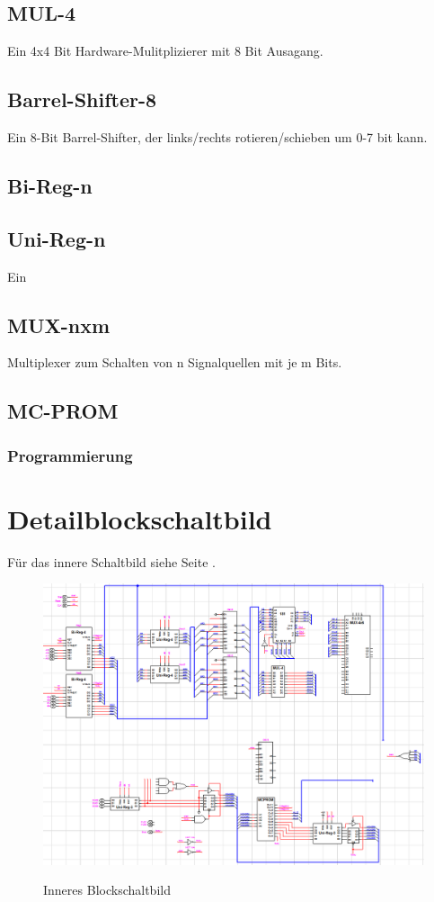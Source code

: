 \documentclass[11pt]{report}
\begin{document}
	\subsection{MUL-4}
	Ein 4x4 Bit Hardware-Mulitplizierer mit 8 Bit Ausagang.
	
	\subsection{Barrel-Shifter-8}
	Ein 8-Bit Barrel-Shifter, der links/rechts rotieren/schieben um  0-7 bit kann.
	\subsection{Bi-Reg-n}
	
	\subsection{Uni-Reg-n}
	Ein 
	
	\subsection{MUX-nxm}
	Multiplexer zum Schalten von n Signalquellen mit je m Bits.
	
	\subsection{MC-PROM}
	\subsubsection{Programmierung}
	
	\section{Detailblockschaltbild}
	Für das innere Schaltbild siehe Seite \pageref{inneresBlockschaltbild}.
	\begin{figure}[htbp]
		\begin{center}
			\includegraphics[width=\textwidth]{inneresBlockschaltbild}
			\label{inneresBlockschaltbild}
			\caption{Inneres Blockschaltbild}
		\end{center}
	\end{figure}
	
\end{document}

